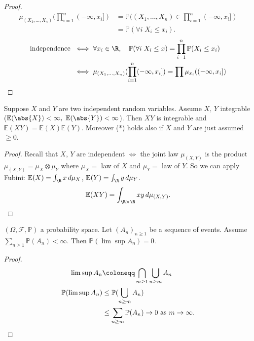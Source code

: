 \documentclass{article}
\newcommand{\1}[1]{\mathbbm{1}_{#1}}
\newcommand{\Prob}{\mathbb{P}}
\newcommand{\E}{\mathbb{E}}
\begin{document}
\begin{proof}
    \begin{align*}
        \mu_{(X_1, \dotsc, X_n)} (\prod_{i=1}^n (-\infty, x_i]) &= \Prob((X_1, \dotsc, X_n) \in \prod_{i=1}^n (-\infty, x_i]) \\
                                                                &= \Prob(\forall i \; X_i \leq x_i).
    \end{align*}
    \begin{align*}
        \text{independence } &\iff \forall x_i \in \R, \quad \Prob(\forall i \; X_i \leq x) = \prod_{i=1}^n \Prob(X_i \leq x_i) \\
                             &\iff \mu_{(X_1, \dotsc, X_n)} (\prod_{i=1}^n (-\infty, x_i]) = \prod \mu_{x_i} ((-\infty, x_i]) \qedhere
    \end{align*}
\end{proof}


\begin{prop}
    Suppose $X$ and $Y$ are two independent random variables.
    Assume $X$, $Y$ integrable ($\E(\abs{X}) < \infty,\ \E(\abs{Y}) < \infty$).
    Then $XY$ is integrable and $\E(XY) = \E(X)\E(Y)$.
    Moreover (*) holds also if $X$ and $Y$ are just assumed $\geq 0$.
\end{prop}

\begin{proof}
    Recall that $X$, $Y$ are independent $\iff$ the joint law $\mu_{(X,Y)}$ is the product $\mu_{(X,Y)} = \mu_X \otimes \mu_Y$ where $\mu_X=$ law of $X$ and $\mu_Y=$ law of $Y$.
    So we can apply Fubini: $\E(X) = \int_\R x \, d \mu_X$, $\E(Y) = \int_\R y \, d \mu_Y$.
    \begin{equation*}
        \E(XY) = \int_{\R \times \R} xy \, d\mu_{(X,Y)}. \qedhere
    \end{equation*}
\end{proof}

\begin{lemma}
    $(\Omega, \mathcal{F}, \Prob)$ a probability space.
    Let $(A_n)_{n \geq 1}$ be a sequence of events.
    Assume $\sum_{n \geq 1} \Prob(A_n) < \infty$.
    Then $\Prob(\lim \sup A_n) = 0$.
\end{lemma}
\begin{proof}
    \begin{align*}
        \lim \sup A_n &\coloneqq \bigcap_{m \geq 1} \bigcup_{n \geq m} A_n \\
        \Prob(\lim \sup A_n) &\leq \Prob(\bigcup_{n \geq m} A_n) \\
                             &\leq \sum_{n \geq m} \Prob(A_n) \to 0 \text{ as } m \to \infty.\qedhere
    \end{align*}
\end{proof}
\end{document}

